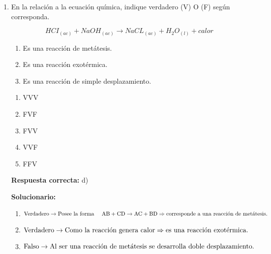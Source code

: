 \begin{enumerate}[resume]
	
	\item En la relación a la ecuación química, indique verdadero (V) O (F) según corresponda.
	
	$$ HC{I_{(ac)}} + NaO{H_{(ac)}} \to  NaC{L_{(ac)} + {H_2}{O_{(l)}} + calor }$$
		

	\begin{enumerate}[label=\Roman*.]
		\item Es una reacción de metátesis.
		\item Es una reacción exotérmica.
		\item Es una reacción de simple desplazamiento.
	\end{enumerate}
	
	
	\begin{enumerate}[label=\alph*)]
		\item VVV
		\item FVF
		\item FVV
		\item VVF
		\item FFV
	\end{enumerate}
	
	\textbf{Respuesta correcta:} d)
	
	\vspace{2mm}
	\textbf{Solucionario:}
	
	
	\begin{enumerate}[label=\Roman*.]
		\item ${\rm{Verdadero}} \to \text{Posee la forma}\,\,\,\,\,\,\,\,{\rm{AB}} + {\rm{CD}} \to {\rm{AC}} + {\rm{BD}}\\
		{\rm{   }} \Rightarrow {\text{corresponde a una reacción de metátesis. }}$
		
		\item ${\rm{Verdadero}} \to \text{Como la reacción genera calor}\\
		{\rm{   }} \Rightarrow {\text{es una reacción exotérmica. }}$
		
		\item ${\rm{Falso}} \to \text{Al ser una reacción de metátesis se desarrolla doble desplazamiento.}$\\
		
	\end{enumerate}
	
\end{enumerate}


